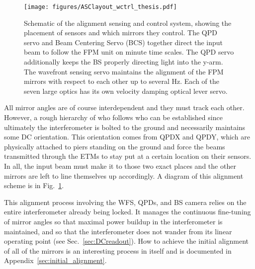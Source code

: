 \begin{figure} 
\begin{centering} 
\texttt{[image: figures/ASClayout\_wctrl\_thesis.pdf]} 
\caption[Schematic of the alignment sensing and control system]{Schematic of the alignment sensing and control system, showing the placement of sensors and which mirrors they control. The QPD servo and Beam Centering Servo (BCS) together direct the input beam to follow the FPM unit on minute time scales. The QPD servo additionally keeps the BS properly directing light into the y-arm. The wavefront sensing servo maintains the alignment of the FPM mirrors with respect to each other up to several Hz. Each of the seven large optics has its own velocity damping optical lever servo.}
\label{fig:ASClayout}
\end{centering}
\end{figure}

All mirror angles are of course interdependent and they must track each other. However, a rough hierarchy of who follows who can be established since ultimately the interferometer is bolted to the ground and necessarily maintains some DC orientation. This orientation comes from QPDX and QPDY, which are physically attached to piers standing on the ground and force the beams transmitted through the ETMs to stay put at a certain location on their sensors. In all, the input beam must make it to those two exact places and the other mirrors are left to line themselves up accordingly. A diagram of this alignment scheme is in Fig.~\ref{fig:ASClayout}.



This alignment process involving the WFS, QPDs, and BS camera relies on the entire interferometer already being locked. It manages the continuous fine-tuning of mirror angles so that maximal power buildup in the interferometer is maintained, and so that the interferometer does not wander from its linear operating point (see Sec.~\ref{sec:DCreadout}). How to achieve the initial alignment of all of the mirrors is an interesting process in itself and is documented in Appendix~\ref{sec:initial_alignment}.




